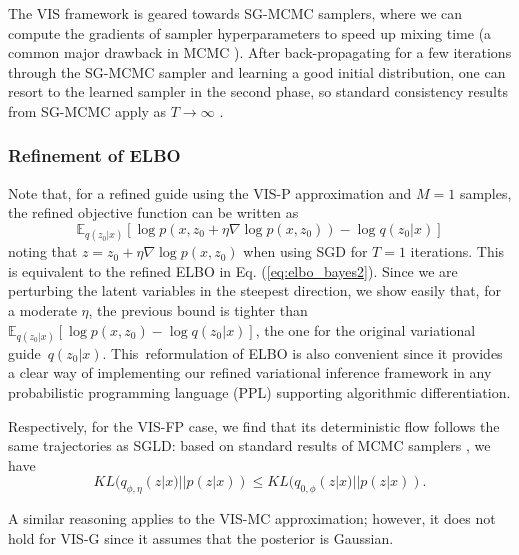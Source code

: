 The VIS framework is geared towards SG-MCMC samplers, where we can compute the gradients of sampler hyperparameters to speed up mixing time (a common major drawback in MCMC \parencite{graves2011automatic}).
After back-propagating for a few iterations through the SG-MCMC sampler and learning a good initial distribution, one can resort to the learned sampler in the second phase, so standard consistency results from SG-MCMC apply as $T \rightarrow \infty$ \parencite{brooks2011handbook}.

\subsubsection*{Refinement of ELBO}\label{sec:rewriting}

 Note that, for a refined guide using the VIS-P approximation and $M=1$ samples, the refined objective function can be written as 
$$
 \mathbb{E}_{q(z_0|x)} \left[ \log p(x, z_0 + \eta \nabla \log p(x,z_0) ) - \log q(z_0 | x)\right]
$$
noting that $z = z_0 + \eta \nabla \log p(x,z_0)$ when using SGD for $T=1$ iterations.
This is equivalent to the refined ELBO in Eq. (\ref{eq:elbo_bayes2}). Since we are perturbing the latent variables in the steepest direction, we show easily that, for a moderate $\eta$, the previous bound is tighter than
$\mathbb{E}_{q(z_0|x)} \left[ \log p(x, z_0  ) - \log q(z_0 | x)\right]$, the one for the original variational guide~$q(z_0 | x)$. This~reformulation of ELBO is also convenient since it provides a clear way of implementing our refined variational inference framework in any probabilistic 
programming language (PPL) supporting algorithmic differentiation.

Respectively, for the VIS-FP case, we find that its 
deterministic flow follows the same trajectories as SGLD: 
based on standard results of MCMC samplers \parencite{murray2008notes}, we have 
$$
KL(q_{\phi,\eta}(z|x) ||  p(z|x)) \leq KL(q_{0, \phi}(z|x) ||  p(z|x)).
$$

A similar reasoning applies to the VIS-MC approximation; however, it does not hold for VIS-G since it assumes that the posterior is Gaussian.

